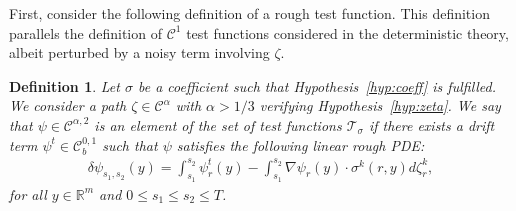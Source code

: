 \documentclass[12pt,reqno]{amsart}
\numberwithin{equation}{section}  %
\newcommand{\1}{{\bf 1}}
\newcommand{\2}{{\bf 2}}
\newtheorem{definition}[theorem]{Definition}
\theoremstyle{remark}
\theoremstyle{remark}
\begin{document}
%





First, consider the following definition of a rough test function. This definition parallels the definition of 
$\mathcal C^1$ test functions considered in the deterministic theory, albeit perturbed by a noisy term involving $\zeta$.

\begin{definition}\label{def:test}
	Let $\sigma$ be a coefficient such that Hypothesis~\ref{hyp:coeff} is fulfilled. We consider a path $\zeta \in \mathcal C^\alpha$ with $\alpha > 1/3$ verifying Hypothesis~\ref{hyp:zeta}. We say that $\psi \in \mathcal C^{\alpha,2}$ is an element of the set of test functions $\mathcal T_\sigma$ if there exists a drift term $\psi^t \in \mathcal C_b^{0,1}$ such that $\psi$ satisfies the following linear rough PDE:
	\begin{align}
		\delta\psi_{s_1,s_2}(y) = \int_{s_1}^{s_2} \psi_r^t(y) - \int_{s_1}^{s_2} \nabla \psi_r(y) \cdot \sigma^k(r,y) d\zeta_r^k,
	\end{align}
	for all $y\in \mathbb R^m$ and $0 \leq s_1\leq s_2\leq T$.
\end{definition}
\end{document}
